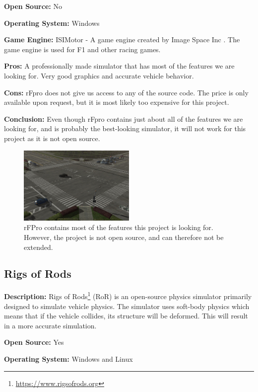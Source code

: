 \textbf{Open Source:} No

\textbf{Operating System:} Windows

\textbf{Game Engine:} ISIMotor - A game engine created by Image Space Inc \cite{ISIMotor}. The game engine is used for F1 and other racing games.

\textbf{Pros:} A professionally made simulator that has most of the features we are looking for. Very good graphics and accurate vehicle behavior. 

\textbf{Cons:} rFpro does not give us access to any of the source code. The price is only available upon request, but it is most likely too expensive for this project. 

\textbf{Conclusion:} Even though rFpro contains just about all of the features we are looking for, and is probably the best-looking simulator, it will not work for this project as it is not open source. 

\begin{figure}[H]
    \centering
    \includegraphics[width=0.5\textwidth]{03_Background/Appendix/Simulators/rFpro.jpg}
    \caption[rFpro]{rFPro contains most of the features this project is looking for. However, the project is not open source, and can therefore not be extended.}
\end{figure}

\subsection{Rigs of Rods}
\textbf{Description:} Rigs of Rods\footnote{\url{https://www.rigsofrods.org}} (RoR) is an open-source physics simulator primarily designed to simulate vehicle physics. The simulator uses soft-body physics which means that if the vehicle collides, its structure will be deformed. This will result in a more accurate simulation.

\textbf{Open Source:} Yes

\textbf{Operating System:} Windows and Linux

